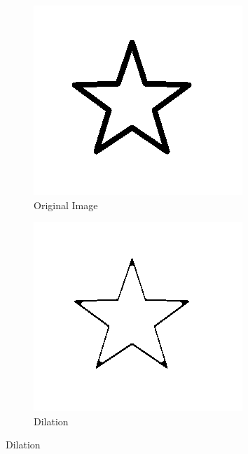 \begin{figure}[h]
    \centering
    \begin{subfigure}{0.33\textwidth}
        \centering
        \includegraphics[width=.9\linewidth]{images/literature/star}
        \caption{Original Image}
    \end{subfigure}%
    \begin{subfigure}{.33\textwidth}
        \centering
        \includegraphics[width=.9\linewidth]{images/literature/dilation}
        \caption{Dilation}
    \end{subfigure}%

\end{figure}
